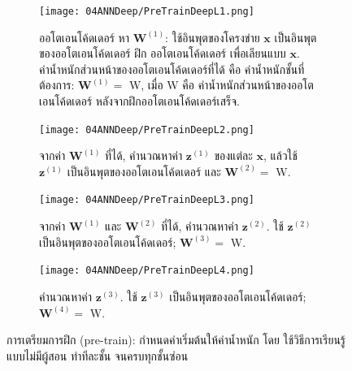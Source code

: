 \begin{figure}
\centering
\begin{subfigure}[b]{\textwidth}
\texttt{[image: 04ANNDeep/PreTrainDeepL1.png]}
\caption{ออโตเอนโค้ดเดอร์ หา $\mathbf{W}^{(1)}$: ใช้อินพุตของโครงข่าย $\mathbf{x}$ เป็นอินพุตของออโตเอนโค้ดเดอร์ ฝึก ออโตเอนโค้ดเดอร์ เพื่อเลียนแบบ $\mathbf{x}$.
ค่าน้ำหนักส่วนหน้าของออโตเอนโค้ดเดอร์ที่ได้ คือ ค่าน้ำหนักชั้นที่ต้องการ: $\mathbf{W}^{(1)} = $ W, เมื่อ W คือ ค่าน้ำหนักส่วนหน้าของออโตเอนโค้ดเดอร์ หลังจากฝึกออโตเอนโค้ดเดอร์เสร็จ.
}
\label{fig: deep autoencoder L1}
\end{subfigure}%

\begin{subfigure}[b]{\textwidth}
\texttt{[image: 04ANNDeep/PreTrainDeepL2.png]}
\caption{จากค่า $\mathbf{W}^{(1)}$ ที่ได้, คำนวณหาค่า $\mathbf{z}^{(1)}$ ของแต่ละ $\mathbf{x}$, แล้วใช้ $\mathbf{z}^{(1)}$ เป็นอินพุตของออโตเอนโค้ดเดอร์
และ $\mathbf{W}^{(2)}  = $ W.
}
\label{fig: deep autoencoder L2}
\end{subfigure}%

\begin{subfigure}[b]{\textwidth}
\texttt{[image: 04ANNDeep/PreTrainDeepL3.png]}
\caption{จากค่า $\mathbf{W}^{(1)}$ และ $\mathbf{W}^{(2)}$ ที่ได้, คำนวณหาค่า $\mathbf{z}^{(2)}$.
ใช้ $\mathbf{z}^{(2)}$ เป็นอินพุตของออโตเอนโค้ดเดอร์; $\mathbf{W}^{(3)}  = $ W.
}
\label{fig: deep autoencoder L3}
\end{subfigure}%

\begin{subfigure}[b]{\textwidth}
\texttt{[image: 04ANNDeep/PreTrainDeepL4.png]}
\caption{คำนวณหาค่า $\mathbf{z}^{(3)}$. 
ใช้ $\mathbf{z}^{(3)}$ เป็นอินพุตของออโตเอนโค้ดเดอร์; $\mathbf{W}^{(4)}  = $ W.}
\label{fig: deep autoencoder L4}
\end{subfigure}%

\caption{การเตรียมการฝึก (pre-train): กำหนดค่าเริ่มต้นให้ค่าน้ำหนัก โดย ใช้วิธีการเรียนรู้แบบไม่มีผู้สอน ทำทีละชั้น
จนครบทุกชั้นซ่อน}
\label{fig: deep layer-wise pretrain}
\end{figure}

